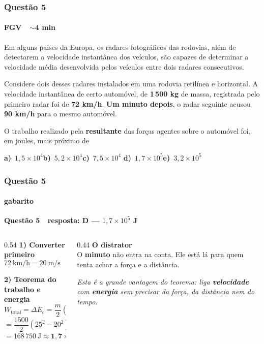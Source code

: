 \documentclass[aspectratio=169,12pt]{beamer}
\newcommand{\alternativascurtas}[5]{%
  \par\vspace{0.7em}%
  \noindent\textbf{a)}~#1\hfill\textbf{b)}~#2\hfill\textbf{c)}~#3%
  \hfill\textbf{d)}~#4\hfill\textbf{e)}~#5\par}
\newcommand{\resposta}[2]{%
  \par\vspace{0.2em}
  {\Large\bfseries\color{vinho}Quest\~ao #1 \,\textemdash\, resposta: #2}
  \par\vspace{0.6em}}
\begin{document}
\begin{frame}
\frametitle{Quest\~ao 5}
\framesubtitle{FGV \,\textperiodcentered\, $\sim$4 min}

\small
Em alguns pa\'ises da Europa, os radares fotogr\'aficos das rodovias,
al\'em de detectarem a velocidade instant\^anea dos ve\'iculos, s\~ao
capazes de determinar a velocidade m\'edia desenvolvida pelos
ve\'iculos entre dois radares consecutivos.

\vspace{0.3em}
Considere dois desses radares instalados em uma rodovia retil\'inea e
horizontal. A velocidade instant\^anea de certo autom\'ovel, de
\textbf{1\,500 kg} de massa, registrada pelo primeiro radar foi de
\textbf{72 km/h}. \textbf{Um minuto depois}, o radar seguinte acusou
\textbf{90 km/h} para o mesmo autom\'ovel.

\vspace{0.3em}
O trabalho realizado pela \textbf{resultante} das for\c{c}as agentes
sobre o autom\'ovel foi, em joules, mais pr\'oximo de

\alternativascurtas{$1{,}5 \times 10^{4}$}{$5{,}2 \times 10^{4}$}%
{$7{,}5 \times 10^{4}$}{$1{,}7 \times 10^{5}$}{$3{,}2 \times 10^{5}$}
\end{frame}

\begin{frame}
\frametitle{Quest\~ao 5}
\framesubtitle{gabarito}
\resposta{5}{D --- $1{,}7\times 10^{5}$ J}

\begin{columns}[T]
\begin{column}{0.54\textwidth}
\textbf{1) Converter primeiro}
\[ 72\ \text{km/h} = 20\ \text{m/s} \qquad
   90\ \text{km/h} = 25\ \text{m/s} \]

\textbf{2) Teorema do trabalho e energia}
\[ W_{\text{total}} = \Delta E_c
   = \frac{m}{2}\left(v_f^2 - v_i^2\right) \]
\[ = \frac{1500}{2}\left(25^2 - 20^2\right) = 750\cdot 225 \]
\[ = 168\,750\ \text{J} \approx \mathbf{1{,}7\times 10^{5}\ J} \]
\end{column}
\begin{column}{0.44\textwidth}
\textbf{O distrator}\\
O \textbf{minuto} n\~ao entra na conta. Ele est\'a l\'a para quem
tenta achar a for\c{c}a e a dist\^ancia.

\vspace{0.6em}
{\color{grafite}\itshape Esta \'e a grande vantagem do teorema: liga
\textbf{velocidade} com \textbf{energia} sem precisar da for\c{c}a,
da dist\^ancia nem do tempo.}
\end{column}
\end{columns}
\end{frame}
\end{document}
